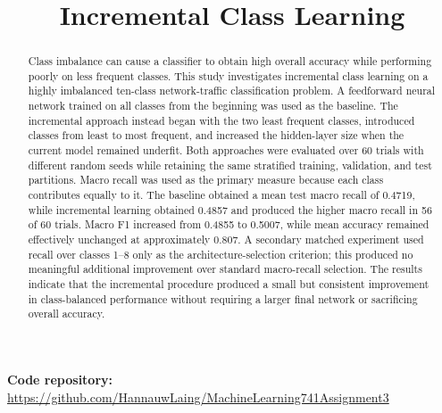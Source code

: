 \documentclass[conference]{IEEEtran}
\begin{document}
\title{Incremental Class Learning}

\author{
}

\maketitle


%


\noindent\textbf{Code repository:} \url{https://github.com/HannauwLaing/MachineLearning741Assignment3}

\begin{abstract}
Class imbalance can cause a classifier to obtain high overall accuracy while performing poorly on less frequent classes. This study investigates incremental class learning on a highly imbalanced ten-class network-traffic classification problem. A feedforward neural network trained on all classes from the beginning was used as the baseline. The incremental approach instead began with the two least frequent classes, introduced classes from least to most frequent, and increased the hidden-layer size when the current model remained underfit. Both approaches were evaluated over 60 trials with different random seeds while retaining the same stratified training, validation, and test partitions. Macro recall was used as the primary measure because each class contributes equally to it. The baseline obtained a mean test macro recall of 0.4719, while incremental learning obtained 0.4857 and produced the higher macro recall in 56 of 60 trials. Macro F1 increased from 0.4855 to 0.5007, while mean accuracy remained effectively unchanged at approximately 0.807. A secondary matched experiment used recall over classes 1--8 only as the architecture-selection criterion; this produced no meaningful additional improvement over standard macro-recall selection. The results indicate that the incremental procedure produced a small but consistent improvement in class-balanced performance without requiring a larger final network or sacrificing overall accuracy.
\end{abstract}
\end{document}
